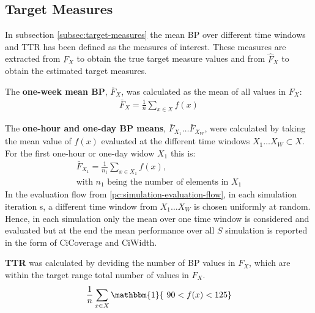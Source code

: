 \subsection{Target Measures}
In subsection \ref{subsec:target-measures} the mean BP over different time
windows and TTR has been defined as the measures of interest. These measures
are extracted from $F_X$ to obtain the true target measure values and
from $\hat{F}_X$ to obtain the estimated target measures.

The \textbf{one-week mean BP}, $\bar{F}_X$, was calculated as the mean of all values in
$F_X$:
\begin{gather*}
    \bar{F}_{X} = \frac{1}{n} \sum_{x \in X} f(x)
\end{gather*}

The \textbf{one-hour and one-day BP means}, $\bar{F}_{X_1} \dots \bar{F}_{X_W}$,
were calculated by taking the mean value of $f(x)$ evaluated at the different
time windows $X_1 \dots X_W \subset X$.
For the first one-hour or one-day widow $X_1$ this is:
\begin{gather*}
    \bar{F}_{X_1} = \frac{1}{n_1} \sum_{x \in X_1} f(x), \\
    \text{with $n_1$ being the number of elements in $X_1$}
\end{gather*}
In the evaluation flow from \ref{pc:simulation-evaluation-flow}, in
each simulation iteration s, a different time window from
$X_1 \dots X_W$ is chosen uniformly at random. Hence, in each simulation
only the mean over one time window is considered and evaluated
but at the end the mean performance over all $S$ simulation is reported in
the form of CiCoverage and CiWidth.


\textbf{TTR} was calculated by deviding the number of BP values in $F_X$,
which are within the target range total number of values in $F_X$.
\begin{gather*}
    \frac{1}{n} \sum_{x \in X} \mathbbm{1}\{\ 90 < f(x) < 125 \}
\end{gather*}




